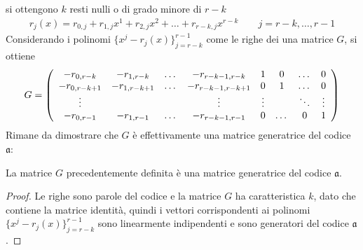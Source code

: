 si ottengono $k$ resti nulli o di grado minore di $r-k$
\begin{align*}
   r_{j}(x) = r_{0,j} + r_{1,j}x^{1} + r_{2,j}x^{2} + \dots + r_{r-k,j}x^{r- k}     \qquad j = r-k , \dots , r-1  
\end{align*}
Considerando i polinomi $\lbrace x^j - r_{j}(x)\rbrace_{j= r-k}^{r-1}$ come le righe dei una matrice $G$, si ottiene
\begin{align*}
  G = 
  \left(
  \begin{array} {c c c c c c c c}
  -r_{0,r-k}  & -r_{1,r-k}  & \dots & -r_{r-k-1,r-k}  &          1 & 0 & \dots & 0 \\
  -r_{0,r-k+1}  & -r_{1,r-k+1}  & \dots & -r_{r-k-1,r-k+1}  &    0 & 1 & \dots & 0  \\
   \vdots  &  &  & \vdots &                                      \vdots  & & \ddots  & \vdots  \\
  -r_{0,r-1}  & -r_{1,r-1}  & \dots & -r_{r-k-1,r-1}  &           0 & \dots & 0 & 1      
  \end{array}
  \right)
\end{align*}
Rimane da dimostrare che $G$ è effettivamente una matrice generatrice del codice $\mathfrak{a}$:
\begin{teorema}
   La matrice $G$ precedentemente definita è una matrice generatrice del codice $\mathfrak{a}$.
\end{teorema}
\begin{proof}
   Le righe sono parole del codice e la matrice $G$ ha caratteristica $k$, dato che contiene la matrice identità, quindi i vettori corrispondenti ai polinomi $\lbrace x^j - r_{j}(x)\rbrace_{j= r-k}^{r-1}$ sono linearmente indipendenti e sono generatori del codice $\mathfrak{a}$.
\end{proof}



